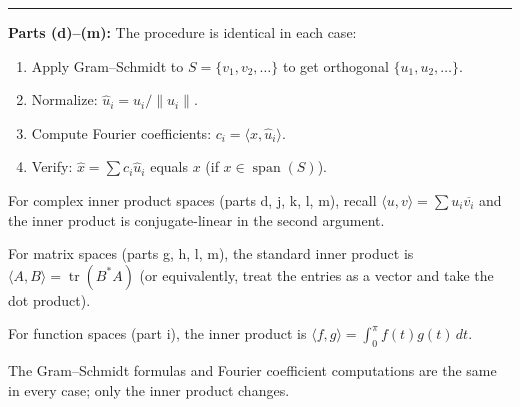 \documentclass{article}
\begin{document}
\begin{mdframed}[linewidth=1pt]
\bigskip
\hrule
\bigskip

\textbf{Parts (d)--(m):} The procedure is identical in each case:
\begin{enumerate}
    \item Apply Gram--Schmidt to $S = \{v_1, v_2, \dots\}$ to get orthogonal $\{u_1, u_2, \dots\}$.
    \item Normalize: $\hat{u}_i = u_i / \|u_i\|$.
    \item Compute Fourier coefficients: $c_i = \langle x, \hat{u}_i \rangle$.
    \item Verify: $\hat{x} = \sum c_i \hat{u}_i$ equals $x$ (if $x \in \operatorname{span}(S)$).
\end{enumerate}
For complex inner product spaces (parts d, j, k, l, m), recall $\langle u, v \rangle = \sum u_i \overline{v_i}$ and the inner product is conjugate-linear in the second argument.

For matrix spaces (parts g, h, l, m), the standard inner product is $\langle A, B \rangle = \operatorname{tr}(B^* A)$ (or equivalently, treat the entries as a vector and take the dot product).

For function spaces (part i), the inner product is $\langle f, g \rangle = \int_0^\pi f(t)g(t)\,dt$.

The Gram--Schmidt formulas and Fourier coefficient computations are the same in every case; only the inner product changes.

\end{mdframed}
\end{document}
